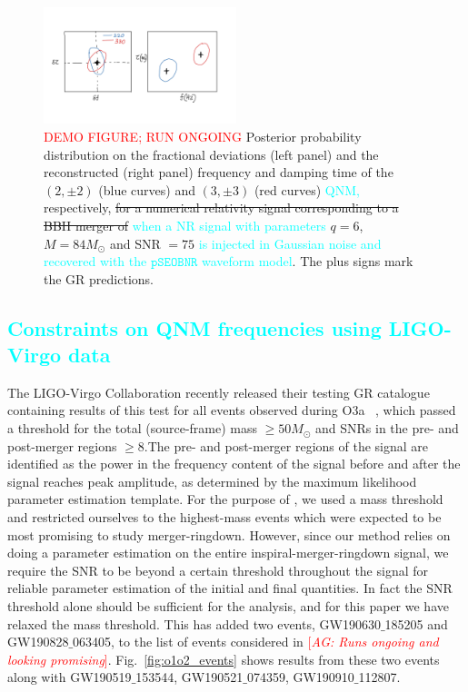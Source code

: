 \documentclass[twocolumn,prd,aps,superscriptaddress,preprintnumbers,tightenlines,showpacs,nofootinbib,eqsecnum,amsfonts,amsmath]{revtex4-1}
\newcommand{\abhi}[1]{\textcolor{red}{[\textit{AG: #1}]}}
\newcommand{\ab}[1]{\textcolor{cyan}{#1}}
\newcommand{\Mo}{M_{\odot}}
\newcommand{\pSEOB}{\texttt{pSEOBNR}}
\begin{document}

\begin{figure}
	\includegraphics[width=0.5\textwidth]{figures/nohair_sxs_0166_placeholder.png}	
	\caption{\textcolor{red}{DEMO FIGURE; RUN ONGOING} Posterior probability distribution on the fractional deviations (left panel) and the reconstructed (right panel) frequency and damping time of the $(2,\pm 2)$ (blue curves) and $(3,\pm 3)$ (red curves) \ab{QNM,} respectively, \sout{for a numerical relativity signal corresponding to a BBH merger of} \ab{when a NR signal with parameters} $q=6$,  $M=84 \Mo$ and SNR $=75$ \ab{is injected in Gaussian noise and recovered with the $\pSEOB$ waveform model}. The plus signs mark the GR predictions.}
	\label{fig:nohair_sxs}
\end{figure}

\ab{\section{Constraints on QNM frequencies using LIGO-Virgo data}}

The LIGO-Virgo Collaboration recently released their testing GR catalogue containing results of this test for all events observed during O3a ~\cite{Abbott:2020jks}, which passed a threshold for the total (source-frame) mass $\geq 50 \Mo$ and SNRs in the pre- and post-merger regions $\geq 8$.The pre- and post-merger regions of the signal are identified as the power in the frequency content of the signal before and after the signal reaches peak amplitude, as determined by the maximum likelihood parameter estimation template. For the purpose of \cite{Abbott:2020jks}, we used a mass threshold and restricted ourselves to the highest-mass events which were expected to be most promising to study merger-ringdown. However, since our method relies on doing a parameter estimation on the entire inspiral-merger-ringdown signal, we require the SNR to be beyond a certain threshold throughout the signal for reliable parameter estimation of the initial and final quantities. In fact the SNR threshold alone should be sufficient for the analysis, and for this paper we have relaxed the mass threshold. This has added two events, GW190630$\_$185205 and GW190828$\_$063405, to the list of events considered in \cite{Abbott:2020jks} \abhi{Runs ongoing and looking promising}. Fig.~\ref{fig:o1o2_events} shows results from these two events along with GW190519$\_$153544, GW190521$\_$074359, GW190910$\_$112807.
\end{document}
